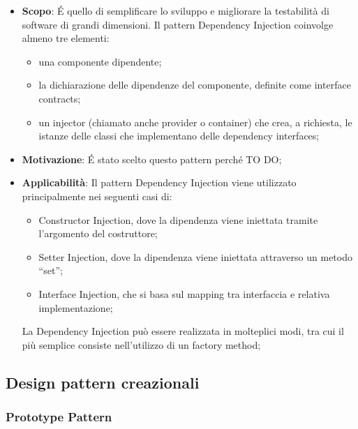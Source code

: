 		\begin{itemize}
			\item \textbf{Scopo}: \'E quello di semplificare lo sviluppo e migliorare la testabilità di software di grandi dimensioni.
Il pattern Dependency Injection coinvolge almeno tre elementi:

				\begin{itemize}
					\item una componente dipendente;
					\item la dichiarazione delle dipendenze del componente, definite come interface contracts;
					\item un injector (chiamato anche provider o container) che crea, a richiesta, le istanze delle classi che implementano delle dependency interfaces;
				\end{itemize}

			\item \textbf{Motivazione}: \'E stato scelto questo pattern perché TO DO;

			\item \textbf{Applicabilità}: Il pattern Dependency Injection viene utilizzato principalmente nei seguenti casi di:
			\begin{itemize}
			\item Constructor Injection, dove la dipendenza viene iniettata tramite l’argomento del costruttore;
			\item Setter Injection, dove la dipendenza viene iniettata attraverso un metodo “set”;
			\item Interface Injection, che si basa sul mapping tra interfaccia e relativa implementazione;
			\end{itemize}
La Dependency Injection può essere realizzata in molteplici modi, tra cui il più semplice consiste nell'utilizzo di un factory method;

		\end{itemize}



	\clearpage
	\newpage
	\subsection{Design pattern creazionali} %
		\subsubsection{Prototype Pattern} %

